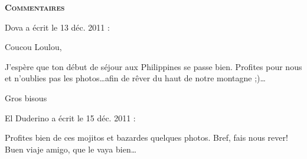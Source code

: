\bigskip
\textbf{\textsc{Commentaires}}

\medskip
Dova a écrit le 13 déc. 2011 :
\begin{displayquote}
Coucou Loulou,

J'espère que ton début de séjour aux Philippines se passe bien.
Profites pour nous et n'oublies pas les photos\dots afin de rêver du haut de notre montagne ;)\dots

Gros bisous
\end{displayquote}

\medskip
El Duderino a écrit le 15 déc. 2011 :
\begin{displayquote}
Profites bien de ces mojitos et bazardes quelques photos. Bref, fais nous rever!
Buen viaje amigo, que le vaya bien\dots
\end{displayquote}

\vfill
